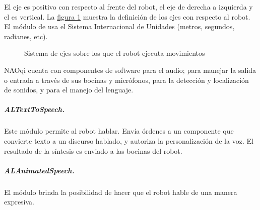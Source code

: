 
El eje  es positivo con respecto al frente del robot, el eje  de
derecha a izquierda y el  es vertical.
La \hyperref[\detokenize{chapter_one/naoqi:almotionaxis}]{figura \ref{\detokenize{chapter_one/naoqi:almotionaxis}}} muestra la definición de los ejes con respecto al robot.
El módulo de  usa el Sistema Internacional de Unidades (metros,
segundos, radianes, etc).
\begin{figure}[!ht]
\centering
\capstart

\noindent{}
\caption{Sistema de ejes sobre los que el robot ejecuta movimientos}\label{\detokenize{chapter_one/naoqi:almotionaxis}}\end{figure}




NAOqi cuenta con componentes de software para el audio; para
manejar la salida o entrada a través de sus bocinas y micrófonos,
para la detección y localización de sonidos,  y para el manejo del lenguaje.


\subparagraph{ALTextToSpeech.}
\label{\detokenize{chapter_one/naoqi:altexttospeech}}
Este módulo permite al robot hablar. Envía órdenes a un componente que
convierte texto a un discurso hablado, y autoriza la personalización de la voz.
El resultado de la síntesis es enviado a las bocinas del robot.


\subparagraph{ALAnimatedSpeech.}
\label{\detokenize{chapter_one/naoqi:alanimatedspeech}}
El módulo  brinda la posibilidad de hacer que el robot hable
de una manera expresiva.

